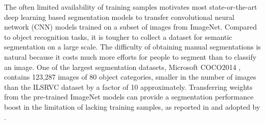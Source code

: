 
The often limited availability of training samples motivates most state-or-the-art deep learning based segmentation models \cite{long2015fully,chen2016deeplab,he2017mask} to transfer convolutional neural network (CNN) models \cite{krizhevsky2012imagenet,simonyan2014very,szegedy2015going,he2016deep} trained on a subset of images from ImageNet.
Compared to object recognition tasks, it is tougher to collect a dataset for semantic segmentation on a large scale.
The difficulty of obtaining manual segmentations is natural because it costs much more efforts for people to segment than to classify an image.
One of the largest segmentation datasets, Microsoft COCO2014 \cite{lin2014microsoft}, contains 123,287 images of 80 object categories, smaller in the number of images than the ILSRVC dataset by a factor of 10 approximately.
Transferring weights from the pre-trained ImageNet models can provide a segmentation performance boost in the limitation of lacking training samples, as reported in \cite{long2015fully} and adopted by \cite{chen2016deeplab,he2017mask}.



